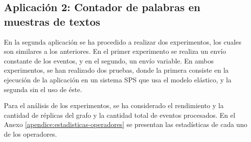 \subsection{Aplicación 2: Contador de palabras en muestras de textos}
En la segunda aplicación se ha procedido a realizar dos experimentos, los cuales son similares a los anteriores. En el primer experimento se realiza un envío constante de los eventos, y en el segundo, un envío variable. En ambos experimentos, se han realizado dos pruebas, donde la primera consiste en la ejecución de la aplicación en un sistema SPS que usa el modelo elástico, y la segunda sin el uso de éste.

\normalsize{Para el análisis de los experimentos, se ha considerado el rendimiento y la cantidad de réplicas del grafo y la cantidad total de eventos procesados. En el Anexo} \ref{apendice:estadisticas-operadores} \normalsize{se presentan las estadísticas de cada uno de los operadores.}


